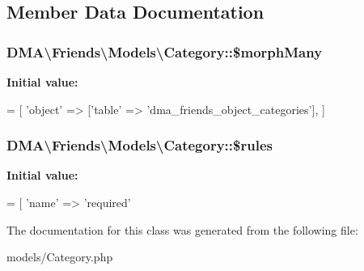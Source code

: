 \subsection{Member Data Documentation}
\hypertarget{classDMA_1_1Friends_1_1Models_1_1Category_a50575142a249c510106a75d42b71391b}{
\subsubsection[{\$morph\-Many}]{\setlength{\rightskip}{0pt plus 5cm}D\-M\-A\textbackslash{}\-Friends\textbackslash{}\-Models\textbackslash{}\-Category\-::\$morph\-Many}}\label{classDMA_1_1Friends_1_1Models_1_1Category_a50575142a249c510106a75d42b71391b}
{\bfseries Initial value\-:}
\begin{DoxyCode}
= [ 
        \textcolor{stringliteral}{'object'} => [\textcolor{stringliteral}{'table'} => \textcolor{stringliteral}{'dma\_friends\_object\_categories'}],
    ]
\end{DoxyCode}
\hypertarget{classDMA_1_1Friends_1_1Models_1_1Category_ad99b16f55603d86e0a22fa60c22c7300}{
\subsubsection[{\$rules}]{\setlength{\rightskip}{0pt plus 5cm}D\-M\-A\textbackslash{}\-Friends\textbackslash{}\-Models\textbackslash{}\-Category\-::\$rules}}\label{classDMA_1_1Friends_1_1Models_1_1Category_ad99b16f55603d86e0a22fa60c22c7300}
{\bfseries Initial value\-:}
\begin{DoxyCode}
= [ 
        \textcolor{stringliteral}{'name'} => \textcolor{stringliteral}{'required'}
\end{DoxyCode}


The documentation for this class was generated from the following file\-:\begin{DoxyCompactItemize}
\item 
models/Category.\-php\end{DoxyCompactItemize}

